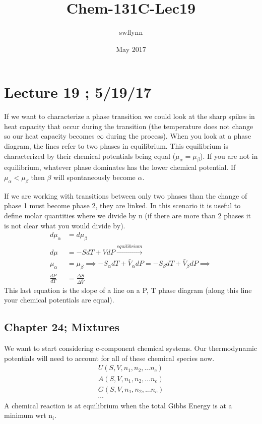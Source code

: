 \documentclass{article}
\title{Chem-131C-Lec19}
\author{swflynn}
\date{May 2017}
\begin{document}
\maketitle

\section*{Lecture 19 ; 5/19/17}
If we want to characterize a phase transition we could look at the sharp spikes in heat capacity that occur during the transition (the temperature does not change so our heat capacity becomes $\infty$ during the process).
When you look at a phase diagram, the lines refer to two phases in equilibrium.
This equilibrium is characterized by their chemical potentials being equal ($\mu_\alpha = \mu_\beta$). 
If  you are not in equilibrium, whatever phase dominates has the lower chemical potential. 
If $\mu_{\alpha} < \mu_{\beta}$ then $\beta$ will spontaneously become $\alpha$. 

If we are working with transitions between only two phases than the change of phase 1 must become phase 2, they are linked. 
In this scenario it is useful to define molar quantities where we divide by n (if there are more than 2 phases it is not clear what you would divide by). 
\begin{equation}
    \begin{split}
        d\mu_\alpha &= d\mu_\beta \\
        d\mu &= -SdT + VdP \xrightarrow{equilibrium}\\
        \mu_\alpha &= \mu_\beta \implies -S_\alpha dT + \bar{V}_\alpha dP =  -S_\beta dT + \bar{V}_\beta dP \implies \\
        \frac{dP}{dT} &= \frac{\Delta \bar{S}}{\Delta \bar{V}}
    \end{split}
\end{equation}
This last equation is the slope of a line on a P, T phase diagram (along this line your chemical potentials are equal). 

\subsection*{Chapter 24; Mixtures}
We want to start considering c-component chemical systems. 
Our thermodynamic potentials will need to account for all of these chemical species now. 
\begin{equation}
    \begin{split}
        U(S,V,n_1,n_2,...n_c)\\
        A(S,V,n_1,n_2,...n_c)\\
        G(S,V,n_1,n_2,...n_c)\\
        \cdots
    \end{split}
\end{equation}
A chemical reaction is at equilibrium when the total Gibbs Energy is at a minimum wrt n$_i$. 
\end{document}

